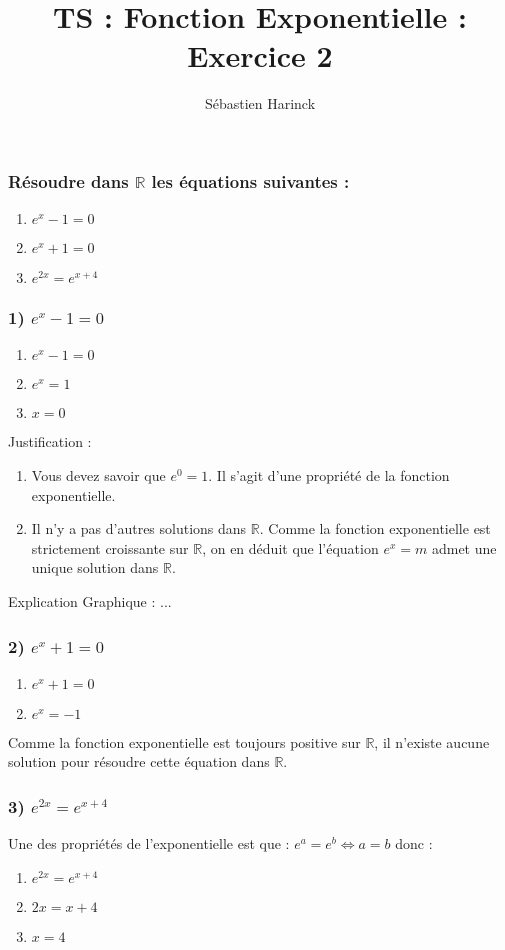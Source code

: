 \documentclass[t]{beamer}
\title{TS : Fonction Exponentielle : Exercice 2}
\author{Sébastien Harinck}
\institute{www.cours-futes.com}
\date{}
\begin{document}
\begin{frame}
\titlepage
\end{frame}

\begin{frame}
\frametitle{Résoudre dans $ \mathbb{R} $ les équations suivantes :}
\pause
\begin{enumerate}[1)]
\item<+-> \( e^{x} -1 = 0\)
\item<+-> \( e^{x} +1 = 0\)
\item<+-> \( e^{2x} = e^{x+4}\)
\end{enumerate}
\end{frame}

\begin{frame}
\frametitle{1) $e^{x} -1 = 0$}
\begin{enumerate}[]
\item<+-> \( e^{x} -1 = 0 \)
\item<+-> \( e^{x} = 1 \)
\item<+-> \( x = 0 \)
\end{enumerate}
\pause
Justification :
\pause
\begin{enumerate}
\item Vous devez savoir que $e^0 = 1$. \pause Il s'agit d'une propriété de la fonction exponentielle. 
\pause
\item Il n'y a pas d'autres solutions dans $ \mathbb{R} $. \pause Comme la fonction exponentielle est strictement croissante sur $ \mathbb{R} $, \pause on en déduit que l'équation $e^x = m$ admet une unique solution dans $ \mathbb{R} $.
\end{enumerate}
\pause
Explication Graphique :
...
\pause
\end{frame}

\begin{frame}
\frametitle{2) $e^{x} +1 = 0$}
\begin{enumerate}[]
\item<+-> \( e^{x} +1 = 0 \)
\item<+-> \( e^{x} = -1 \)
\end{enumerate}
Comme la fonction exponentielle est toujours positive sur $ \mathbb{R} $, il n'existe aucune solution pour résoudre cette équation dans $\mathbb{R}$.
\end{frame}

\begin{frame}
\frametitle{3) $e^{2x} = e^{x+4}$}
\pause
Une des propriétés de l'exponentielle est que :
\( e^a = e^b \Leftrightarrow a = b\)
\pause
donc :
\pause
\begin{enumerate}[$\Leftrightarrow$]
\item<+-> \( e^{2x} = e^{x+4} \)
\item<+-> \(2x = x+4 \)
\item<+-> \( x = 4 \)
\end{enumerate}
\end{frame}
\end{document}
